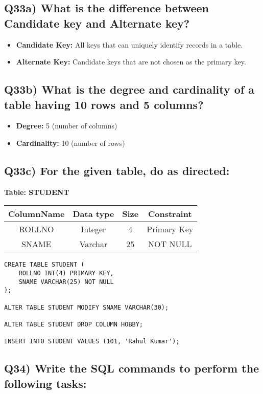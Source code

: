 \documentclass{article}
\begin{document}
\subsection*{Q33a) What is the difference between Candidate key and Alternate key?}
\begin{itemize}
\item \textbf{Candidate Key:} All keys that can uniquely identify records in a table.
\item \textbf{Alternate Key:} Candidate keys that are not chosen as the primary key.
\end{itemize}

\subsection*{Q33b) What is the degree and cardinality of a table having 10 rows and 5 columns?}
\begin{itemize}
\item \textbf{Degree:} 5 (number of columns)
\item \textbf{Cardinality:} 10 (number of rows)
\end{itemize}

\subsection*{Q33c) For the given table, do as directed:}

\textbf{Table: STUDENT}
\begin{center}
\begin{tabular}{|c|c|c|c|}
\hline
ColumnName & Data type & Size & Constraint \\
\hline
ROLLNO & Integer & 4 & Primary Key \\
SNAME & Varchar & 25 & NOT NULL \\
\hline
\end{tabular}
\end{center}

\begin{lstlisting}
CREATE TABLE STUDENT (
    ROLLNO INT(4) PRIMARY KEY,
    SNAME VARCHAR(25) NOT NULL
);

ALTER TABLE STUDENT MODIFY SNAME VARCHAR(30);

ALTER TABLE STUDENT DROP COLUMN HOBBY;

INSERT INTO STUDENT VALUES (101, 'Rahul Kumar');
\end{lstlisting}

\subsection*{Q34) Write the SQL commands to perform the following tasks:}
\end{document}
